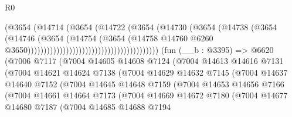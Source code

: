 \begin{lexlean}{R0}
\begin{coremodule}
                                                          (@3654
                                                            (@14714
                                                              (@3654
                                                                (@14722
                                                                  (@3654
                                                                    (@14730
                                                                      (@3654
                                                                        (@14738
                                                                          (@3654
                                                                            (@14746
                                                                              (@3654
                                                                                (@14754
                                                                                  (@3654
                                                                                    (@14758
                                                                                      @14760
                                                                                      @6260
                                                                                      @3650)))))))))))))))))))))))))))))))))))))))))
    (fun (__b : @3395) =>
    @6620
      (@7006
        @7117
        (@7004
          @14605
          @14608
          @7124
          (@7004
            @14613
            @14616
            @7131
            (@7004
              @14621
              @14624
              @7138
              (@7004
                @14629
                @14632
                @7145
                (@7004
                  @14637
                  @14640
                  @7152
                  (@7004
                    @14645
                    @14648
                    @7159
                    (@7004
                      @14653
                      @14656
                      @7166
                      (@7004
                        @14661
                        @14664
                        @7173
                        (@7004
                          @14669
                          @14672
                          @7180
                          (@7004
                            @14677
                            @14680
                            @7187
                            (@7004
                              @14685
                              @14688
                              @7194

\end{coremodule}
\end{lexlean}
